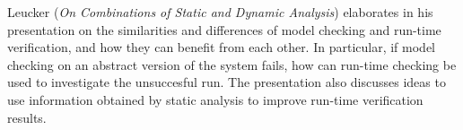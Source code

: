 

Leucker
\cite{isola-2016-leucker}
({\em On Combinations of Static and Dynamic Analysis})
elaborates in his presentation on the similarities and differences of
model checking and run-time verification, and how they can benefit
from each other. In particular, if model checking on an abstract
version of the system fails, how can run-time checking be used to
investigate the unsuccesful run. The presentation also discusses ideas
to use information obtained by static analysis to improve run-time
verification results.